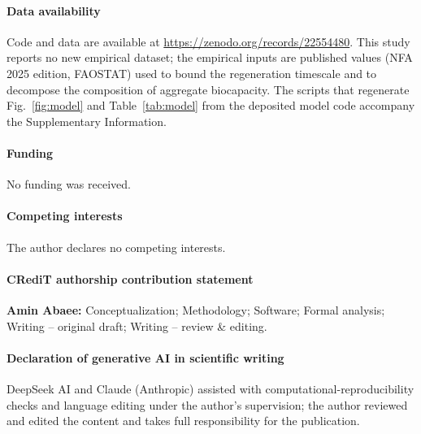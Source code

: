 \documentclass[preprint,12pt,authoryear]{elsarticle}
\begin{document}
\paragraph{Data availability} Code and data are available at \url{https://zenodo.org/records/22554480}. This study reports no new empirical dataset; the empirical inputs are published values (NFA 2025 edition, FAOSTAT) used to bound the regeneration timescale and to decompose the composition of aggregate biocapacity. The scripts that regenerate Fig.~\ref{fig:model} and Table~\ref{tab:model} from the deposited model code accompany the Supplementary Information.

\paragraph{Funding} No funding was received.

\paragraph{Competing interests} The author declares no competing interests.

\paragraph{CRediT authorship contribution statement} \textbf{Amin Abaee:} Conceptualization; Methodology; Software; Formal analysis; Writing -- original draft; Writing -- review \& editing.

\paragraph{Declaration of generative AI in scientific writing} DeepSeek AI and Claude (Anthropic) assisted with computational-reproducibility checks and language editing under the author's supervision; the author reviewed and edited the content and takes full responsibility for the publication.
\end{document}
